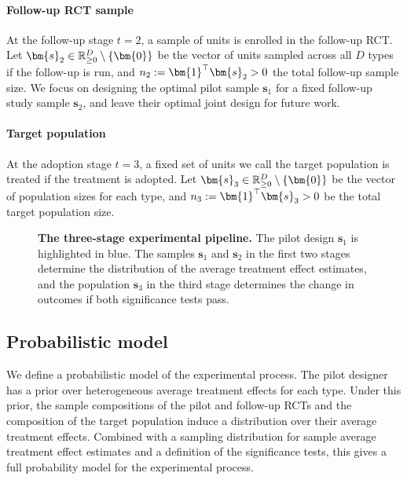 \paragraph{Follow-up RCT sample}
At the follow-up stage $t=2$, a sample of units is enrolled in the follow-up RCT.
Let $\bm{s}_2\in\R_{\geq 0}^{D} \setminus \{\bm{0}\}$ be the vector of units sampled across all $D$ types if the follow-up is run, and $n_2 \defeq \bm{1}^{\top}\bm{s}_2 > 0$ the total follow-up sample size.
We focus on designing the optimal pilot sample $\bm{s}_1$ for a fixed follow-up study sample $\bm{s}_2$, and leave their optimal joint design for future work.

\paragraph{Target population}
At the adoption stage $t=3$, a fixed set of units we call the target population is treated if the treatment is adopted.
Let $\bm{s}_3\in\R_{\geq 0}^{D} \setminus \{\bm{0}\}$ be the vector of population sizes for each type, and $n_3 \defeq \bm{1}^{\top}\bm{s}_3 > 0$ be the total target population size.

\begin{figure}[ht]
  \centering
  
  \caption{
    \textbf{The three-stage experimental pipeline.}
    The pilot design $\bm{s}_1$ is highlighted in blue.
    The samples $\bm{s}_1$ and $\bm{s}_2$ in the first two stages determine the distribution of the average treatment effect estimates, and the population $\bm{s}_3$ in the third stage determines the change in outcomes if both significance tests pass.
  }
  \label{fig:experiment_process_flow}
\end{figure}

\subsection{Probabilistic model}

We define a probabilistic model of the experimental process.
The pilot designer has a prior over heterogeneous average treatment effects for each type.
Under this prior, the sample compositions of the pilot and follow-up RCTs and the composition of the target population induce a distribution over their average treatment effects.
Combined with a sampling distribution for sample average treatment effect estimates and a definition of the significance tests, this gives a full probability model for the experimental process.

